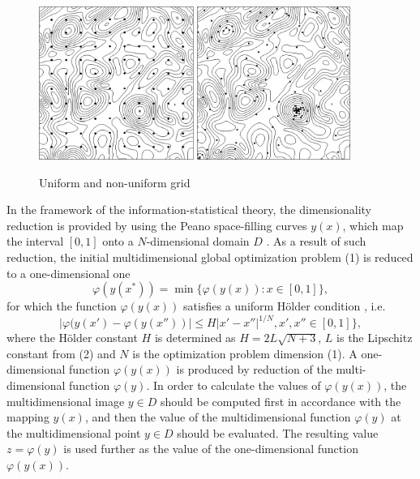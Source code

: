 \documentclass[
11pt,%
tightenlines,%
twoside,%
onecolumn,%
nofloats,%
nobibnotes,%
nofootinbib,%
superscriptaddress,%
noshowpacs,%
centertags]%
{revtex4}
\begin{document}
\begin{figure}
\centering
\includegraphics[height=5.0cm]{Fig1a}
\includegraphics[height=5.0cm]{Fig1b}
\caption{Uniform and non-uniform grid}
\label{fig:Fig1}
\end{figure}

In the framework of the information-statistical theory, the dimensionality reduction is provided by using the Peano space-filling curves $y(x)$, which map the interval $[0, 1]$ onto a $N$-dimensional domain $D$ \cite{Strongin1, Sergeyev2, Strongin3}. As a result of such reduction, the initial multidimensional global optimization problem (1) is reduced to a one-dimensional one 
\begin{equation}
\varphi(y(x^\ast)) = \min\{\varphi(y(x)): x \in [0,1]\},
\end{equation}
for which the function $\varphi(y(x))$ satisfies a uniform H\"older condition \cite{Strongin1}, i.e.
\begin{equation}
|\varphi(y(x')-\varphi(y(x''))| \leq H|x' - x''|^{1/N}, x', x'' \in [0,1]\},
\end{equation}
where the H\"older constant $H$ is determined as $H = 2L\sqrt{N + 3}$, $L$ is the Lipschitz constant from (2) and $N$ is the optimization problem dimension (1). A one-dimensional function $\varphi(y(x))$ is produced by reduction of the multi-dimensional function $\varphi(y)$. In order to calculate the values of $\varphi(y(x))$, the multidimensional image $y \in D$ should be computed first in accordance with the mapping $y(x)$, and then the value of the multidimensional function $\varphi(y)$ at the multidimensional point $y \in D$ should be evaluated. The resulting value $z = \varphi(y)$ is used further as the value of the one-dimensional function $\varphi(y(x))$.
\end{document}
